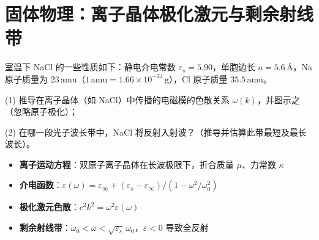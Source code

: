 \section{固体物理：离子晶体极化激元与剩余射线带}
\label{sec:polariton-reststrahlen}

\begin{modelbox}
室温下 NaCl 的一些性质如下：静电介电常数 $\varepsilon_s=5.90$，单胞边长 $a=5.6\,\text{\AA}$，Na 原子质量为 $23\,\text{amu}$（$1\,\text{amu}=1.66\times10^{-24}\,\text{g}$），Cl 原子质量 $35.5\,\text{amu}$。

(1) 推导在离子晶体（如 NaCl）中传播的电磁模的色散关系 $\omega(k)$，并图示之（忽略原子极化）；

(2) 在哪一段光子波长带中，NaCl 将反射入射波？（推导并估算此带最短及最长波长）。
\end{modelbox}

\begin{tipbox}[考点快速分析]
\begin{itemize}
    \item \textbf{离子运动方程}：双原子离子晶体在长波极限下，折合质量 $\mu$、力常数 $\kappa$
    \item \textbf{介电函数}：$\varepsilon(\omega)=\varepsilon_\infty+(\varepsilon_s-\varepsilon_\infty)/(1-\omega^2/\omega_0^2)$
    \item \textbf{极化激元色散}：$c^2k^2=\omega^2\varepsilon(\omega)$
    \item \textbf{剩余射线带}：$\omega_0<\omega<\sqrt{\varepsilon_s}\,\omega_0$，$\varepsilon<0$ 导致全反射
\end{itemize}
\end{tipbox}

